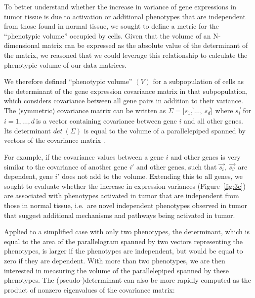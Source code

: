 To better understand whether the increase in variance of gene expressions in tumor tissue is due to activation or additional phenotypes that are independent from those found in normal tissue, we sought to define a metric for the ``phenotypic volume'' occupied by cells.
Given that the volume of an N-dimensional matrix can be expressed as the absolute value of the determinant of the matrix, we reasoned that we could leverage this relationship to calculate the phenotypic volume of our data matrices. %

We therefore defined ``phenotypic volume'' \((V)\) for a subpopulation of cells as the determinant of the gene expression covariance matrix in that subpopulation, which considers covariance between all gene pairs in addition to their variance.
The (symmetric) covariance matrix can be written as \(\Sigma = \lbrack{\overrightarrow{s_{1},}}_{}\ldots,\ \overrightarrow{s_{d}}\rbrack^{}\) where \(\overrightarrow{s_{i}}\) for \(i = 1,\ldots,d\ \)is a vector containing covariance between gene \(i\) and all other genes.
Its determinant \(det\ (\Sigma)\) is equal to the volume of a parallelepiped spanned by vectors of the covariance matrix \citep{Tao2005}.

For example, if the covariance values between a gene \(i\) and other genes is very similar to the covariance of another gene \(i'\) and other genes, such that \(\overrightarrow{s_{i}},\ \overrightarrow{s_{i'}}\) are dependent, gene \(i'\) does not add to the volume.
Extending this to all genes, we sought to evaluate whether the increase in expression variances (Figure~\ref{fig:3c}) are associated with phenotypes activated in tumor that are independent from those in normal tissue, i.e.\ are novel independent phenotypes observed in tumor that suggest additional mechanisms and pathways being activated in tumor.


Applied to a simplified case with only two phenotypes, the determinant, which is equal to the area of the parallelogram spanned by two vectors representing the phenotypes, is larger if the phenotypes are independent, but would be equal to zero if they are dependent.
With more than two phenotypes, we are then interested in measuring the volume of the parallelepiped spanned by these phenotypes.
The (pseudo-)determinant can also be more rapidly computed as the product of nonzero eigenvalues of the covariance matrix:


